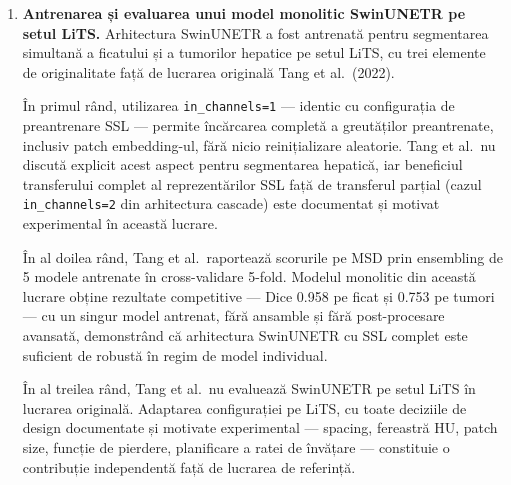 \documentclass[12pt, a4paper]{report}
\begin{document}
\begin{enumerate}
\item \textbf{Antrenarea și evaluarea unui model monolitic
    SwinUNETR pe setul LiTS.} Arhitectura SwinUNETR a fost
    antrenată pentru segmentarea simultană a ficatului și a
    tumorilor hepatice pe setul LiTS, cu trei elemente de
    originalitate față de lucrarea originală Tang et al.\ (2022).

    În primul rând, utilizarea \texttt{in\_channels=1} — identic
    cu configurația de preantrenare SSL — permite încărcarea
    completă a greutăților preantrenate, inclusiv patch embedding-ul,
    fără nicio reinițializare aleatorie. Tang et al.\ nu discută
    explicit acest aspect pentru segmentarea hepatică, iar
    beneficiul transferului complet al reprezentărilor SSL
    față de transferul parțial (cazul \texttt{in\_channels=2}
    din arhitectura cascade) este documentat și motivat experimental
    în această lucrare.

    În al doilea rând, Tang et al.\ raportează scorurile pe MSD
    prin ensembling de 5 modele antrenate în cross-validare
    5-fold. Modelul monolitic din această lucrare obține rezultate
    competitive — Dice 0.958 pe ficat și 0.753 pe tumori — cu un
    singur model antrenat, fără ansamble și fără post-procesare
    avansată, demonstrând că arhitectura SwinUNETR cu SSL complet
    este suficient de robustă în regim de model individual.

    În al treilea rând, Tang et al.\ nu evaluează SwinUNETR pe
    setul LiTS în lucrarea originală. Adaptarea configurației
    pe LiTS, cu toate deciziile de design documentate și motivate
    experimental — spacing, fereastră HU, patch size, funcție de
    pierdere, planificare a ratei de învățare — constituie o
    contribuție independentă față de lucrarea de referință.






\end{enumerate}
\end{document}
